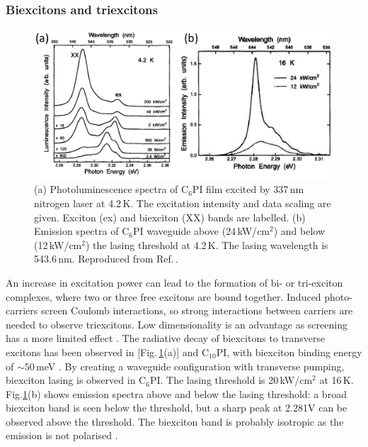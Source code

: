 \subsubsection{Biexcitons and triexcitons}
\begin{figure}[h!]
\centering
\includegraphics[width=\textwidth]{Fig15}
\caption{(a) Photoluminescence spectra of $\textrm{C}_{6}$PI film excited by 337\,nm nitrogen laser at 4.2\,K. The excitation intensity and data scaling are given. Exciton (ex) and biexciton (XX) bands are labelled. (b) Emission spectra of $\textrm{C}_{6}$PI waveguide above (24\,kW/$\textrm{cm}^2$) and below (12\,kW/$\textrm{cm}^2$) the lasing threshold at 4.2\,K. The lasing wavelength is 543.6\,nm. Reproduced from Ref.\,\cite{Kondo1998}.}
\label{2Fig15}
\end{figure}
An increase in excitation power can lead to the formation of bi- or tri-exciton complexes, where two or three free excitons are bound together. Induced photo-carriers screen Coulomb interactions, so strong interactions between carriers are needed to observe triexcitons. Low dimensionality is an advantage as screening has a more limited effect \cite{Shimizu2006a}. The radiative decay of biexcitons to transverse excitons has been observed in  [Fig.\,\ref{2Fig15}(a)] and $\textrm{C}_{10}$PI, with biexciton binding energy of $\sim50$\,meV \cite{Kondo1998, Ishihara1992}. By creating a waveguide configuration with transverse pumping, biexciton lasing is observed in $\textrm{C}_6$PI. The lasing threshold is 20\,kW/$\textrm{cm}^2$ at 16\,K. Fig.\ref{2Fig15}(b) shows emission spectra above and below the lasing threshold: a broad biexciton band is seen below the threshold, but a sharp peak at 2.281V can be observed above the threshold. The biexciton band is probably isotropic as the emission is not polarised \cite{Kondo1998}.

